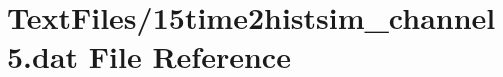 \hypertarget{15time2histsim__channel5_8dat}{}\section{Text\+Files/15time2histsim\+\_\+channel5.dat File Reference}
\label{15time2histsim__channel5_8dat}
